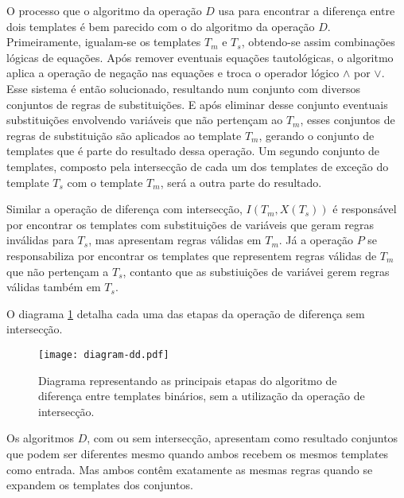 O processo que o algoritmo da operação $D$ usa para encontrar a diferença entre dois templates é bem parecido com o do algoritmo da operação $D$. Primeiramente, igualam-se os templates $T_m$ e $T_s$, obtendo-se assim combinações lógicas de equações. Após remover eventuais equações tautológicas, o algoritmo aplica a operação de negação nas equações e troca o operador lógico $\wedge$ por $\vee$. Esse sistema é então solucionado, resultando num conjunto com diversos conjuntos de regras de substituições. E após eliminar desse conjunto eventuais substituições envolvendo variáveis que não pertençam ao $T_m$, esses conjuntos de regras de substituição são aplicados ao template $T_m$, gerando o conjunto de templates que é parte do resultado dessa operação. Um segundo conjunto de templates, composto pela intersecção de cada um dos templates de exceção do template $T_s$ com o template $T_m$, será a outra parte do resultado.

Similar a operação  de diferença com intersecção, $I(T_m, X(T_s))$ é responsável por encontrar os templates com substituições de variáveis que geram regras inválidas para $T_s$, mas apresentam regras válidas em $T_m$. Já a operação $P$ se responsabiliza por encontrar os templates que representem regras válidas de $T_m$ que não pertençam a $T_s$, contanto que as substiuições de variávei gerem regras válidas também em $T_s$.

O diagrama \ref{fig:diagramInterDd} detalha cada uma das etapas da operação de diferença sem intersecção.
\begin{figure}[h!]
  \centering
  \texttt{[image: diagram-dd.pdf]}
  \caption{Diagrama representando as principais etapas do algoritmo de diferença entre templates binários, sem a utilização da operação de intersecção.}
  \label{fig:diagramInterDd}
\end{figure}

Os algoritmos $D$, com ou sem intersecção, apresentam como resultado conjuntos que podem ser diferentes mesmo quando ambos recebem os mesmos templates como entrada. Mas ambos contêm exatamente as mesmas regras quando se expandem os templates dos conjuntos.

